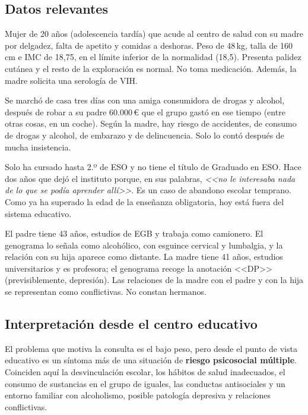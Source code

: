 \documentclass[11pt,a4paper]{article}
\begin{document}
\subsection{Datos relevantes}
\begin{description}[leftmargin=0pt, style=nextline]
  \item[Situación sanitaria] Mujer de 20 años (adolescencia tardía) que acude
  al centro de salud con su madre por delgadez, falta de apetito y comidas a
  deshoras. Peso de 48\,kg, talla de 160\,cm e IMC de 18,75, en el límite
  inferior de la normalidad (18,5). Presenta palidez cutánea y el resto de la
  exploración es normal. No toma medicación. Además, la madre solicita una
  serología de VIH.
  \item[Conductas de riesgo] Se marchó de casa tres días con una amiga
  consumidora de drogas y alcohol, después de robar a su padre 60.000\,€ que el
  grupo gastó en ese tiempo (entre otras cosas, en un coche). Según la madre,
  hay riesgo de accidentes, de consumo de drogas y alcohol, de embarazo y de
  delincuencia. Solo lo contó después de mucha insistencia.
  \item[Situación escolar] Solo ha cursado hasta 2.º de ESO y no tiene el título
  de Graduado en ESO. Hace dos años que dejó el instituto porque, en sus
  palabras, \emph{<<no le interesaba nada de lo que se podía aprender allí>>}.
  Es un caso de abandono escolar temprano. Como ya ha superado la edad de la
  enseñanza obligatoria, hoy está fuera del sistema educativo.
  \item[Contexto familiar (genograma)] El padre tiene 43 años, estudios de EGB y
  trabaja como camionero. El genograma lo señala como alcohólico, con esguince
  cervical y lumbalgia, y la relación con su hija aparece como distante. La
  madre tiene 41 años, estudios universitarios y es profesora; el genograma
  recoge la anotación <<DP>> (previsiblemente, depresión). Las relaciones de la
  madre con el padre y con la hija se representan como conflictivas. No
  constan hermanos.
\end{description}

\subsection{Interpretación desde el centro educativo}
El problema que motiva la consulta es el bajo peso, pero desde el punto de vista
educativo es un síntoma más de una situación de \textbf{riesgo psicosocial
múltiple}. Coinciden aquí la desvinculación escolar, los hábitos de salud
inadecuados, el consumo de sustancias en el grupo de iguales, las conductas
antisociales y un entorno familiar con alcoholismo, posible patología depresiva
y relaciones conflictivas.
\end{document}
